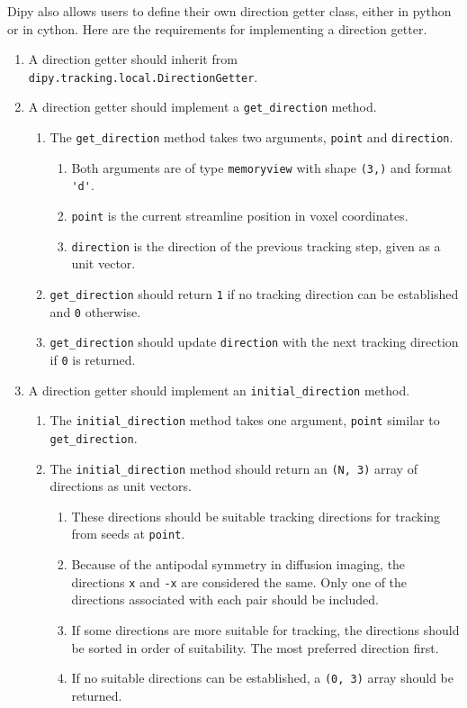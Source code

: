Dipy also allows users to define their own direction getter class, either in python or in cython. Here are the requirements for implementing a direction getter.
\begin{enumerate}
\item A direction getter should inherit from \verb|dipy.tracking.local.DirectionGetter|.
\item A direction getter should implement a \verb|get_direction| method.
\begin{enumerate}
\item The \verb|get_direction| method takes two arguments, \verb|point| and \verb|direction|.
\begin{enumerate}
\item Both arguments are of type \verb|memoryview| with shape \verb|(3,)| and format \verb|'d'|.
\item \verb|point| is the current streamline position in voxel coordinates.
\item \verb|direction| is the direction of the previous tracking step, given as a unit vector.
\end{enumerate}
\item \verb|get_direction| should return \verb|1| if no tracking direction can be established and \verb|0| otherwise.
\item \verb|get_direction| should update \verb|direction| with the next tracking direction if \verb|0| is returned.
\end{enumerate}
\item A direction getter should implement an \verb|initial_direction| method.
\begin{enumerate}
\item The \verb|initial_direction| method takes one argument, \verb|point| similar to \verb|get_direction|.
\item The \verb|initial_direction| method should return an \verb|(N, 3)| array of directions as unit vectors.
\begin{enumerate}
\item These directions should be suitable tracking directions for tracking from seeds at \verb|point|.
\item Because of the antipodal symmetry in diffusion imaging, the directions \verb|x| and \verb|-x| are considered the same. Only one of the directions associated with each pair should be included.
\item If some directions are more suitable for tracking, the directions should be sorted in order of suitability. The most preferred direction first.  
\item If no suitable directions can be established, a \verb|(0, 3)| array should be returned.
\end{enumerate}
\end{enumerate}
\end{enumerate}

